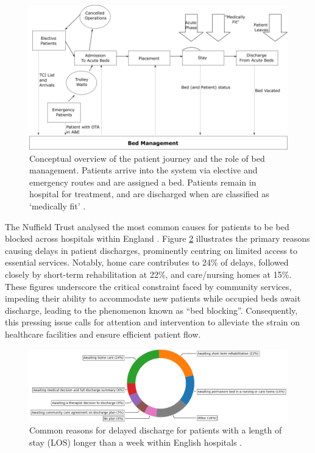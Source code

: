 \documentclass[../thesis.tex]{subfiles}
\begin{document}
\begin{figure}[h!]
    \centering
    \includegraphics[scale=0.6]{Chapters/Chapter1/Figures/bedmanagement.png}
    \caption{Conceptual overview of the patient journey and the role of bed management. Patients arrive into the system via elective and emergency routes and are assigned a bed. Patients remain in hospital for treatment, and are discharged when are classified as `medically fit' \cite{Poudlove2003}.} 
    \label{fig:bedmanagement}
\end{figure}

The Nuffield Trust analysed the most common causes for patients to be bed blocked across hospitals within England \cite{NuffieldTrust2022,NuffieldTrust2022a}. Figure \ref{fig:Piechartdelays} illustrates the primary reasons causing delays in patient discharges, prominently centring on limited access to essential services. Notably, home care contributes to 24\% of delays, followed closely by short-term rehabilitation at 22\%, and care/nursing homes at 15\%. These figures underscore the critical constraint faced by community services, impeding their ability to accommodate new patients while occupied beds await discharge, leading to the phenomenon known as ``bed blocking''. Consequently, this pressing issue calls for attention and intervention to alleviate the strain on healthcare facilities and ensure efficient patient flow.

\begin{figure}[h!]
    \centering
    \includegraphics[scale=0.7]{Chapters/Chapter1/Figures/piechart.png}
    \caption{Common reasons for delayed discharge for patients with a length of stay (LOS) longer than a week within English hospitals \cite{NuffieldTrust2022,NuffieldTrust2022a}.}
    \label{fig:Piechartdelays}
\end{figure}
\end{document}

